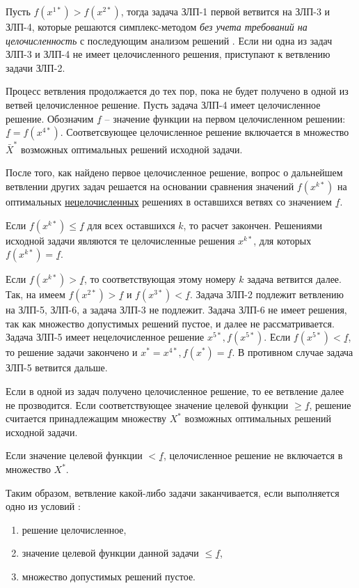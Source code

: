 \documentclass[%
	11pt,
	a4paper,
	utf8,
		]{article}
\begin{document}
Пусть $ f(x^{1*}) > f(x^{2*}) $, тогда задача ЗЛП-1 первой ветвится на ЗЛП-3 и ЗЛП-4, которые решаются симплекс-методом \emph{без учета требований на целочисленность} с последующим анализом решений \cite[]{panteleev}. Если ни одна из задач ЗЛП-3 и ЗЛП-4 не имеет целочисленного решения, приступают к ветвлению задачи ЗЛП-2.

Процесс ветвления продолжается до тех пор, пока не будет получено в одной из ветвей целочисленное решение. Пусть задача ЗЛП-4 имеет целочисленное решение.  Обозначим $ \underline{f} $ -- значение функции на первом целочисленном решении: $ \underline{f} = f(x^{4*}) $. Соответсвующее целочисленное решение включается в множество $ \bar{X}^* $ возможных оптимальных решений исходной задачи.

После того, как найдено первое целочисленное решение, вопрос о дальнейшем ветвлении других задач решается на основании сравнения значений $ f(x^{k*}) $ на оптимальных \underline{нецелочисленных} решениях в оставшихся ветвях со значением $ \underline{f} $.

Если $ f(x^{k*}) \leqslant \underline{f} $ для всех оставшихся $ k $, то расчет закончен. Решениями исходной задачи являются те целочисленные решения $ x^{k*} $, для которых $ f(x^{k*}) = \underline{f} $.

Если $ f(x^{k*}) > \underline{f} $, то соответствующая этому номеру $ k $ задача ветвится далее. Так, на  имеем $ f(x^{2*}) > \underline{f} $ и $ f(x^{3*}) < \underline{f} $. Задача ЗЛП-2 подлежит ветвлению на ЗЛП-5, ЗЛП-6, а задача ЗЛП-3 не подлежит. Задача ЗЛП-6 не имеет решения, так как множество допустимых решений пустое, и далее не рассматривается. Задача ЗЛП-5 имеет нецелочисленное решение $ x^{5*}, f(x^{5*}) $. Если $ f(x^{5*}) < \underline{f} $, то решение задачи закончено и $ x^* = x^{4*}, f(x^*) = \underline{f} $. В противном случае задача ЗЛП-5 ветвится дальше.

Если в одной из задач получено целочисленное решение, то ее ветвление далее не прозводится. Если соответствующее значение целевой функции $ \geqslant \underline{f} $, решение считается принадлежащим множеству $ X^* $ возможных оптимальных решений исходной задачи.

Если значение целевой функции $ < \underline{f} $, целочисленное решение не включается в множество $ X^* $.

Таким образом, ветвление какой-либо задачи заканчивается, если выполняется одно из условий \cite{panteleev}:
\begin{enumerate}
	\item решение целочисленное,
	
	\item значение целевой функции данной задачи $ \leqslant \underline{f} $,
	
	\item множество допустимых решений пустое.
\end{enumerate}
\end{document}
